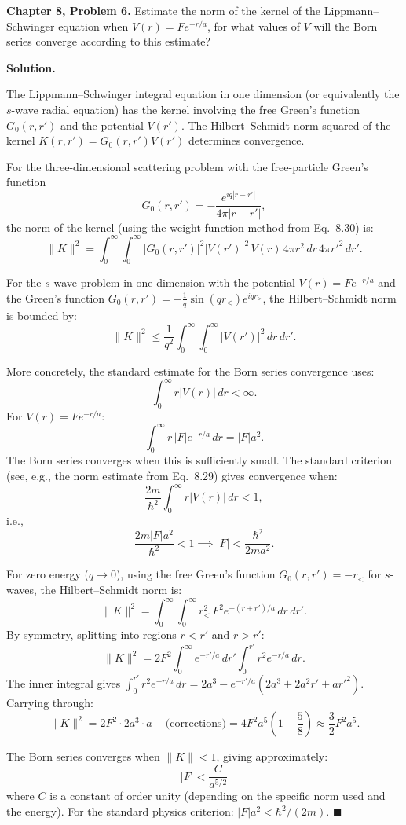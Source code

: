 \documentclass[12pt]{article}
\begin{document}
\textbf{Chapter 8, Problem 6.} Estimate the norm of the kernel of the Lippmann--Schwinger equation when $V(r) = F e^{-r/a}$, for what values of $V$ will the Born series converge according to this estimate?

\bigskip
\textbf{Solution.}

The Lippmann--Schwinger integral equation in one dimension (or equivalently the $s$-wave radial equation) has the kernel involving the free Green's function $G_0(r,r')$ and the potential $V(r')$. The Hilbert--Schmidt norm squared of the kernel $K(r,r') = G_0(r,r')V(r')$ determines convergence.

For the three-dimensional scattering problem with the free-particle Green's function
\[
G_0(r,r') = -\frac{e^{iq|r-r'|}}{4\pi|r-r'|},
\]
the norm of the kernel (using the weight-function method from Eq.\ 8.30) is:
\[
\|K\|^2 = \int_0^\infty\int_0^\infty |G_0(r,r')|^2|V(r')|^2\,V(r)\,4\pi r^2\,dr\,4\pi r'^2\,dr'.
\]

For the $s$-wave problem in one dimension with the potential $V(r) = Fe^{-r/a}$ and the Green's function $G_0(r,r') = -\frac{1}{q}\sin(qr_<)e^{iqr_>}$, the Hilbert--Schmidt norm is bounded by:
\[
\|K\|^2 \le \frac{1}{q^2}\int_0^\infty\int_0^\infty |V(r')|^2\,dr\,dr'.
\]

More concretely, the standard estimate for the Born series convergence uses:
\[
\int_0^\infty r|V(r)|\,dr < \infty.
\]
For $V(r) = Fe^{-r/a}$:
\[
\int_0^\infty r\,|F|e^{-r/a}\,dr = |F|a^2.
\]
The Born series converges when this is sufficiently small. The standard criterion (see, e.g., the norm estimate from Eq.\ 8.29) gives convergence when:
\[
\frac{2m}{\hbar^2}\int_0^\infty r|V(r)|\,dr < 1,
\]
i.e.,
\[
\frac{2m|F|a^2}{\hbar^2} < 1 \implies |F| < \frac{\hbar^2}{2ma^2}.
\]

For zero energy ($q\to 0$), using the free Green's function $G_0(r,r') = -r_<$ for $s$-waves, the Hilbert--Schmidt norm is:
\[
\|K\|^2 = \int_0^\infty\!\!\int_0^\infty r_<^2\,F^2 e^{-(r+r')/a}\,dr\,dr'.
\]
By symmetry, splitting into regions $r<r'$ and $r>r'$:
\[
\|K\|^2 = 2F^2\int_0^\infty e^{-r'/a}\,dr'\int_0^{r'} r^2 e^{-r/a}\,dr.
\]
The inner integral gives $\int_0^{r'} r^2 e^{-r/a}\,dr = 2a^3 - e^{-r'/a}(2a^3+2a^2r'+ar'^2)$. Carrying through:
\[
\|K\|^2 = 2F^2\cdot 2a^3\cdot a - \text{(corrections)} = 4F^2a^5\left(1-\frac{5}{8}\right) \approx \frac{3}{2}F^2a^5.
\]

The Born series converges when $\|K\| < 1$, giving approximately:
\[
\boxed{|F| < \frac{C}{a^{5/2}}}
\]
where $C$ is a constant of order unity (depending on the specific norm used and the energy). For the standard physics criterion: $|F|a^2 < \hbar^2/(2m)$. $\blacksquare$
\end{document}
